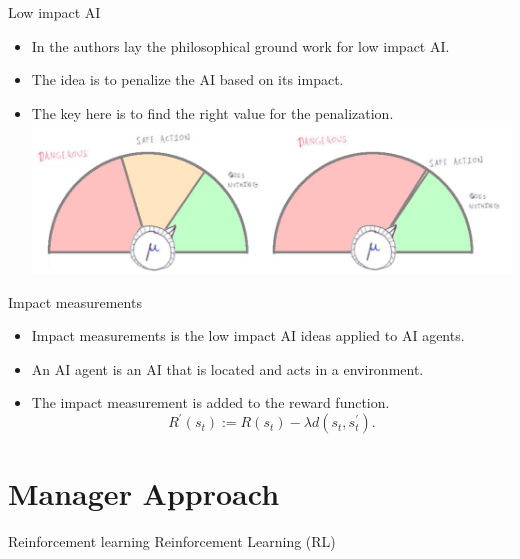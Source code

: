 \documentclass[10pt]{beamer}
\begin{document}
\begin{frame}{Low impact AI}
  \begin{itemize}[<+- | alert@+>]
    \item In \citet{ArmstrongLevinstein} the authors lay the philosophical ground work for low impact AI. 
    \item The idea is to penalize the AI based on its impact.
    \item The key here is to find the right value for the penalization.\\
    \includegraphics[scale=0.2]{images/dial.png}
  \end{itemize}
  
\end{frame}

\begin{frame}{Impact measurements}
  \begin{itemize}[<+- | alert@+>]
    \item Impact measurements is the low impact AI ideas applied to AI agents. 
    \item An AI agent is an AI that is located and acts in a environment.\\
  
    \item The impact measurement is added to the reward function.
    \[ R^\prime(s_{t}) := R(s_{t}) - \lambda d(s_{t}, s_{t}^\prime). \]
  \end{itemize}

\end{frame}


\section{Manager Approach}

\begin{frame}{Reinforcement learning}
  Reinforcement Learning (RL)
  
\end{frame}
\end{document}
